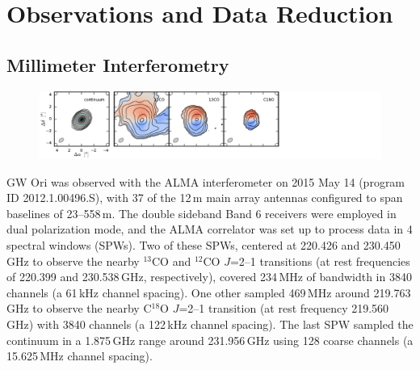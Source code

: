 \documentclass[twocolumn]{aastex6}
\begin{document}
\section{Observations and Data Reduction \label{sec:obs}}


\subsection{Millimeter Interferometry}

\begin{figure}[ht!]
\begin{center}
  \includegraphics[width=\linewidth]{moments.pdf}
  \end{center}
\end{figure}

GW Ori was observed with the ALMA interferometer on 2015 May 14 (program ID 2012.1.00496.S), with 37 of the 12\,m main array antennas configured to span baselines of 23--558\,m.  The double sideband Band 6 receivers were employed in dual polarization mode, and the ALMA correlator was set up to process data in 4 spectral windows (SPWs).  Two of these SPWs, centered at 220.426 and 230.450\,GHz to observe the nearby $^{13}$CO and $^{12}$CO $J$=2--1 transitions (at rest frequencies of 220.399 and 230.538\,GHz, respectively), covered 234\,MHz of bandwidth in 3840 channels (a 61\,kHz channel spacing).  One other sampled 469\,MHz around 219.763\,GHz to observe the nearby C$^{18}$O $J$=2--1 transition (at rest frequency 219.560\,GHz) with 3840 channels (a 122\,kHz channel spacing).  The last SPW sampled the continuum in a 1.875\,GHz range around 231.956\,GHz using 128 coarse channels (a 15.625\,MHz channel spacing).
\end{document}
